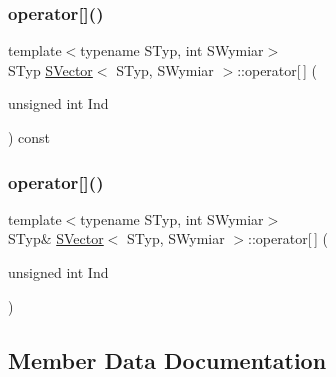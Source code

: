 \mbox{\label{classSVector_a1791455c796655130e02fddab501c0d5}} 
\subsubsection{\texorpdfstring{operator[]()}{operator[]()}\hspace{0.1cm}{\footnotesize\ttfamily [1/2]}}
{\footnotesize\ttfamily template$<$typename S\+Typ, int S\+Wymiar$>$ \\
S\+Typ \hyperlink{classSVector}{S\+Vector}$<$ S\+Typ, S\+Wymiar $>$\+::operator\mbox{[}$\,$\mbox{]} (\begin{DoxyParamCaption}\item[{unsigned int}]{Ind }\end{DoxyParamCaption}) const\hspace{0.3cm}{\ttfamily [inline]}}

\mbox{\label{classSVector_ad45c95945940a25c4d9bbb7c7eca6226}} 
\subsubsection{\texorpdfstring{operator[]()}{operator[]()}\hspace{0.1cm}{\footnotesize\ttfamily [2/2]}}
{\footnotesize\ttfamily template$<$typename S\+Typ, int S\+Wymiar$>$ \\
S\+Typ\& \hyperlink{classSVector}{S\+Vector}$<$ S\+Typ, S\+Wymiar $>$\+::operator\mbox{[}$\,$\mbox{]} (\begin{DoxyParamCaption}\item[{unsigned int}]{Ind }\end{DoxyParamCaption})\hspace{0.3cm}{\ttfamily [inline]}}



\subsection{Member Data Documentation}
\mbox{\label{classSVector_abbb1d8aef561cf02a7071e79b7f17134}} 
